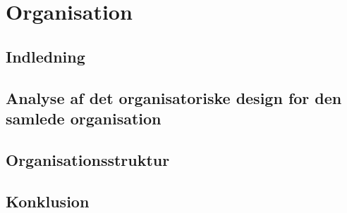 \documentclass[../main.tex]{subfiles}
\begin{document}
\pagebreak

\section{Organisation}

\subsection{Indledning}          

\subsection{Analyse af det organisatoriske design for den samlede organisation}

\subsection{Organisationsstruktur}

\subsection{Konklusion}
\end{document}
